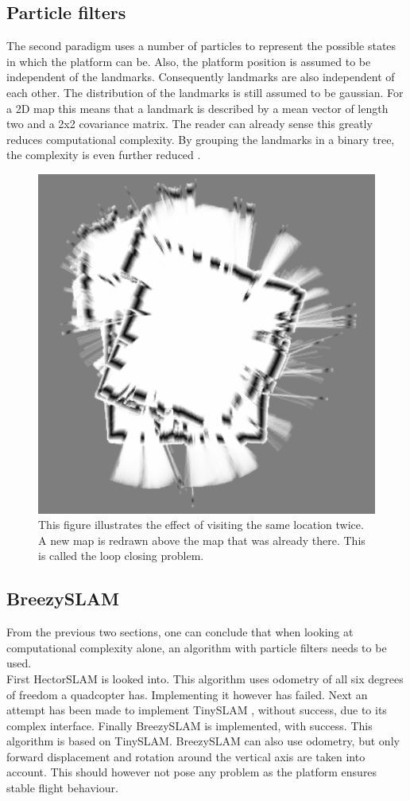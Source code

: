 \documentclass[twocolumn]{phdsymp} %
\begin{document}
\subsection{Particle filters}
The second paradigm uses a number of particles to represent the possible states in which the platform can be. Also, the platform position is assumed to be independent of the landmarks. Consequently landmarks are also independent of each other. The distribution of the landmarks is still assumed to be gaussian. For a 2D map this means that a landmark is described by a mean vector of length two and a 2x2 covariance matrix. The reader can already sense this greatly reduces computational complexity. By grouping the landmarks in a binary tree, the complexity is even further reduced \cite{paper:FastSLAM}.

\begin{figure}[t]
	\centering
	\includegraphics[width=0.8\linewidth]{loopclosure}
	\caption{This figure illustrates the effect of visiting the same location twice. A new map is redrawn above the map that was already there. This is called the loop closing problem.} \label{fig:loopclosing}
\end{figure}

\subsection{BreezySLAM}
From the previous two sections, one can conclude that when looking at computational complexity alone, an algorithm with particle filters needs to be used.\\
First HectorSLAM \cite{paper:hectorSLAM} is looked into. This algorithm uses odometry of all six degrees of freedom a quadcopter has. Implementing it however has failed. Next an attempt has been made to implement TinySLAM \cite{paper:tinySLAM2}, without success, due to its complex interface. Finally BreezySLAM \cite{thesis:BreezySLAM} is implemented, with success. This algorithm is based on TinySLAM. BreezySLAM can also use odometry, but only forward displacement and rotation around the vertical axis are taken into account. This should however not pose any problem as the platform ensures stable flight behaviour.
\end{document}
